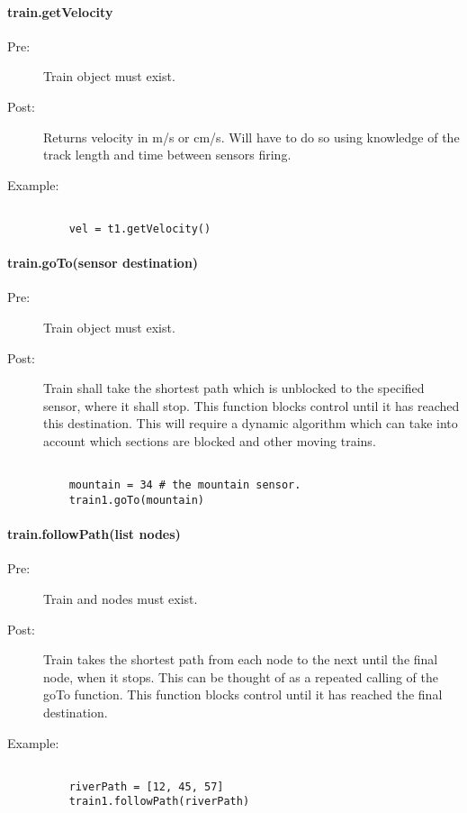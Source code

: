 \documentclass[a4paper,11pt,notitlepage]{article}
\begin{document}
\paragraph{train.getVelocity}
\begin{description}
\item[\hspace{1cm}Pre:] Train object must exist.
\item[\hspace{1cm}Post:] Returns velocity in m/s or cm/s. Will have to do so using knowledge of the track length and time between sensors firing.
\item[\hspace{1cm}Example:]
\begin{verbatim}

    vel = t1.getVelocity()
\end{verbatim}
\end{description}

\paragraph{train.goTo(sensor destination)}
\begin{description}
\item[\hspace{1cm}Pre:] Train object must exist.
\item[\hspace{1cm}Post:] Train shall take the shortest path which is unblocked to the specified sensor, where it shall stop. This function blocks control until it has reached this destination. This will require a dynamic algorithm which can take into account which sections are blocked and other moving trains.
\begin{verbatim}

    mountain = 34 # the mountain sensor.
    train1.goTo(mountain)
\end{verbatim}
\end{description}

\paragraph{train.followPath(list nodes)}
\begin{description}
\item[\hspace{1cm}Pre:] Train and nodes must exist.
\item[\hspace{1cm}Post:] Train takes the shortest path from each node to the next until the final node, when it stops. This can be thought of as a repeated calling of the goTo function. This function blocks control until it has reached the final destination.
\item[\hspace{1cm}Example:]

\begin{verbatim}

    riverPath = [12, 45, 57]
    train1.followPath(riverPath)
\end{verbatim}

\end{description}
\end{document}
